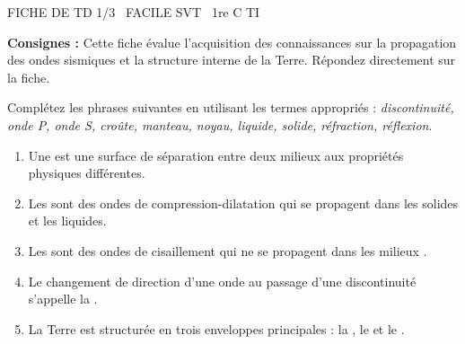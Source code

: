 \documentclass[11pt]{article}
\begin{document}
\begin{tcolorbox}[enhanced,colback=popink,colframe=popink,arc=10pt,boxrule=0pt,left=12pt,right=12pt,top=9pt,bottom=9pt]
{\color{white}\popxbold\small FICHE DE TD 1/3 \textbullet\ FACILE \hfill SVT \textbullet\ 1re C TI\par}
\end{tcolorbox}
\vspace{4pt}
\noindent\textbf{Consignes :} Cette fiche évalue l'acquisition des connaissances sur la propagation des ondes sismiques et la structure interne de la Terre. Répondez directement sur la fiche.

\begin{exercice}
Complétez les phrases suivantes en utilisant les termes appropriés : \textit{discontinuité, onde P, onde S, croûte, manteau, noyau, liquide, solide, réfraction, réflexion}.
\begin{enumerate}
    \item Une \underline{\hspace{5cm}} est une surface de séparation entre deux milieux aux propriétés physiques différentes.
    \item Les \underline{\hspace{5cm}} sont des ondes de compression-dilatation qui se propagent dans les solides et les liquides.
    \item Les \underline{\hspace{5cm}} sont des ondes de cisaillement qui ne se propagent \underline{\hspace{3cm}} dans les milieux \underline{\hspace{3cm}}.
    \item Le changement de direction d'une onde au passage d'une discontinuité s'appelle la \underline{\hspace{5cm}}.
    \item La Terre est structurée en trois enveloppes principales : la \underline{\hspace{3cm}}, le \underline{\hspace{3cm}} et le \underline{\hspace{3cm}}.
\end{enumerate}
\end{exercice}
\end{document}
